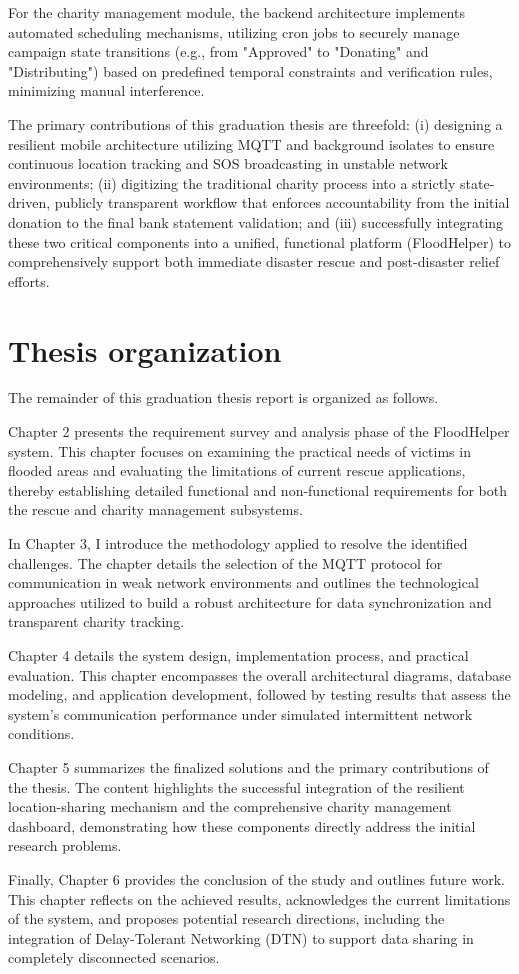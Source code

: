 \documentclass[../Main.tex]{subfiles}
\begin{document}
For the charity management module, the backend architecture implements automated scheduling mechanisms, utilizing cron jobs to securely manage campaign state transitions (e.g., from "Approved" to "Donating" and "Distributing") based on predefined temporal constraints and verification rules, minimizing manual interference.

The primary contributions of this graduation thesis are threefold: (i) designing a resilient mobile architecture utilizing MQTT and background isolates to ensure continuous location tracking and SOS broadcasting in unstable network environments; (ii) digitizing the traditional charity process into a strictly state-driven, publicly transparent workflow that enforces accountability from the initial donation to the final bank statement validation; and (iii) successfully integrating these two critical components into a unified, functional platform (FloodHelper) to comprehensively support both immediate disaster rescue and post-disaster relief efforts.

\section{Thesis organization}
\label{section:1.4}

The remainder of this graduation thesis report is organized as follows.

Chapter 2 presents the requirement survey and analysis phase of the FloodHelper system. This chapter focuses on examining the practical needs of victims in flooded areas and evaluating the limitations of current rescue applications, thereby establishing detailed functional and non-functional requirements for both the rescue and charity management subsystems.

In Chapter 3, I introduce the methodology applied to resolve the identified challenges. The chapter details the selection of the MQTT protocol for communication in weak network environments and outlines the technological approaches utilized to build a robust architecture for data synchronization and transparent charity tracking.

Chapter 4 details the system design, implementation process, and practical evaluation. This chapter encompasses the overall architectural diagrams, database modeling, and application development, followed by testing results that assess the system's communication performance under simulated intermittent network conditions.

Chapter 5 summarizes the finalized solutions and the primary contributions of the thesis. The content highlights the successful integration of the resilient location-sharing mechanism and the comprehensive charity management dashboard, demonstrating how these components directly address the initial research problems.

Finally, Chapter 6 provides the conclusion of the study and outlines future work. This chapter reflects on the achieved results, acknowledges the current limitations of the system, and proposes potential research directions, including the integration of Delay-Tolerant Networking (DTN) to support data sharing in completely disconnected scenarios.
\end{document}
